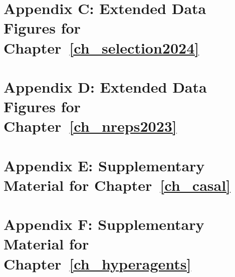 \documentclass[12pt,oneside,letterpaper]{report}
\begin{document}
\section*{Appendix C: Extended Data Figures for Chapter~\ref{ch_selection2024}}

\clearpage
{}

\section*{Appendix D: Extended Data Figures for Chapter~\ref{ch_nreps2023}}

\clearpage
{}

\section*{Appendix E: Supplementary Material for Chapter~\ref{ch_casal}}

\clearpage
{}

\section*{Appendix F: Supplementary Material for Chapter~\ref{ch_hyperagents}}

\clearpage
{}



\cleardoublepage
{}

%
%
%

% 

\printbibliography
\end{document}
